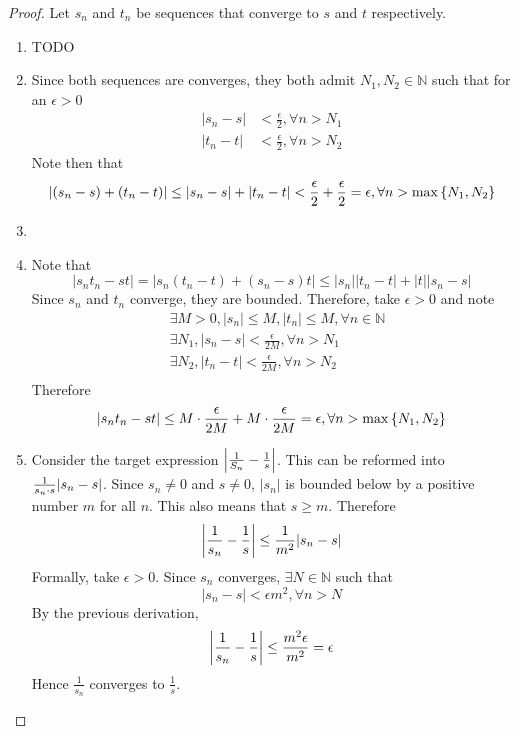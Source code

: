 \documentclass[../notes.tex]{subfiles}
\begin{document}
\begin{proof}
	Let $s_n$ and $t_n$ be sequences that converge to $s$ and $t$ respectively.
	\begin{enumerate}[label=\alph*)]
		\item TODO
		\item 
            Since both sequences are converges, they both admit $N_1, N_2 \in \mathbb{N}$ such that for an $\epsilon > 0$
            \begin{align*}
            |s_n - s| &< \frac{\epsilon}{2}, \forall n > N_1 \\
            |t_n - t| &< \frac{\epsilon}{2}, \forall n > N_2
            \end{align*}
            Note then that 
            \[
            |(s_n - s) + (t_n - t)| \leq |s_n - s| + |t_n - t| < \frac{\epsilon}{2} + \frac{\epsilon}{2} = \epsilon, \forall n > \max\qty{N_1, N_2}
            \]
        \item
        \item
            Note that
            \[
                |s_n t_n - st| = |s_n(t_n - t) + (s_n - s)t| \leq |s_n| |t_n - t| + |t| |s_n - s|
            \]
            Since $s_n$ and $t_n$ converge, they are bounded. Therefore, take $\epsilon > 0$ and note
            \begin{align*}
                &\exists M > 0, |s_n| \leq M, |t_n| \leq M, \forall n \in \mathbb{N} \\
                &\exists N_1, |s_n - s| < \frac{\epsilon}{2M}, \forall n > N_1 \\
                &\exists N_2, |t_n - t| < \frac{\epsilon}{2M}, \forall n > N_2 \\
            \end{align*}
            Therefore 
            \[
                |s_n t_n - st| \leq M \cdot \frac{\epsilon}{2M} + M \cdot \frac{\epsilon}{2M} = \epsilon, \forall n > \max\qty{N_1, N_2}
            \]
        \item
            Consider the target expression $\qty|\frac{1}{S_n} - \frac{1}{s}|$. This can be reformed into $\frac{1}{s_n \cdot s} \qty|s_n - s|$. Since $s_n \neq 0$ and $s \neq 0$, $|s_n|$ is bounded below by a positive number $m$ for all $n$. This also means that $s \geq m$. Therefore
            \[
                \qty|\frac{1}{s_n} - \frac{1}{s}| \leq \frac{1}{m^2} |s_n - s|
            \]
            Formally, take $\epsilon > 0$. Since $s_n$ converges, $\exists N \in \mathbb{N}$ such that
            \[
                |s_n - s| < \epsilon m^2, \forall n > N
            \]
            By the previous derivation,
            \[
                \qty|\frac{1}{s_n} - \frac{1}{s}| \leq \frac{m^2 \epsilon}{m^2} = \epsilon
            \]
            Hence $\frac{1}{s_n}$ converges to $\frac{1}{s}$.
	\end{enumerate}
\end{proof}
\end{document}

